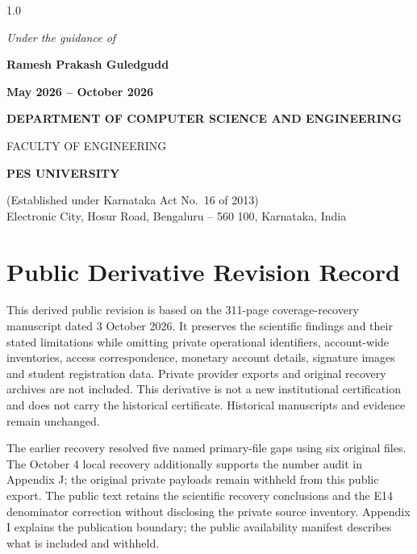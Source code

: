 \begin{titlepage}
\begin{spacing}{1.0}
\vspace{0.5em}
{\normalsize\itshape Under the guidance of\par}
\vspace{0.2em}
{\large\bfseries Ramesh Prakash Guledgudd\par}

\vspace{0.6em}
{\normalsize\bfseries\color{pesmaroon} May 2026 -- October 2026\par}

\vfill

{\normalsize\bfseries DEPARTMENT OF COMPUTER SCIENCE AND ENGINEERING\par}
{\normalsize FACULTY OF ENGINEERING\par}
{\large\bfseries PES UNIVERSITY\par}
{\footnotesize (Established under Karnataka Act No.\ 16 of 2013)\\
Electronic City, Hosur Road, Bengaluru -- 560 100, Karnataka, India\par}
\end{spacing}
\end{titlepage}



\chapter*{Public Derivative Revision Record}
This derived public revision is based on the 311-page coverage-recovery manuscript dated 3 October 2026. It preserves the scientific findings and their stated limitations while omitting private operational identifiers, account-wide inventories, access correspondence, monetary account details, signature images and student registration data. Private provider exports and original recovery archives are not included. This derivative is not a new institutional certification and does not carry the historical certificate. Historical manuscripts and evidence remain unchanged.

The earlier recovery resolved five named primary-file gaps using six original files. The October 4 local recovery additionally supports the number audit in Appendix J; the original private payloads remain withheld from this public export. The public text retains the scientific recovery conclusions and the E14 denominator correction without disclosing the private source inventory. Appendix I explains the publication boundary; the public availability manifest describes what is included and withheld.

